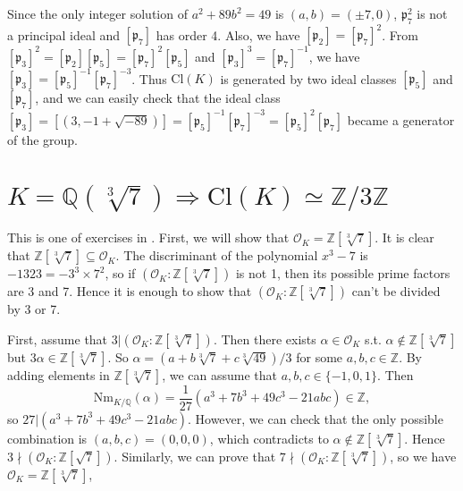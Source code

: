 \documentclass{article}
\newcommand{\Nm}{\mathrm{Nm}}
\newcommand{\Cl}{\mathrm{Cl}}
\begin{document}
Since the only integer solution of $a^{2} + 89b^{2} = 49$ is $(a, b) = (\pm 7, 0)$, $\mathfrak{p}_{7}^{2}$ is not a principal ideal and $[\mathfrak{p}_{7}]$ has order 4. Also, we have $[\mathfrak{p}_{2}] = [\mathfrak{p}_{7}]^{2}$. From $[\mathfrak{p}_{3}]^{2} = [\mathfrak{p}_{2}][\mathfrak{p}_{5}] = [\mathfrak{p}_{7}]^{2}[\mathfrak{p}_{5}]$ and $[\mathfrak{p}_{3}]^{3} = [\mathfrak{p}_{7}]^{-1}$, we have $[\mathfrak{p}_{3}] = [\mathfrak{p}_{5}]^{-1}[\mathfrak{p}_{7}]^{-3}$. 
Thus $\Cl(K)$ is generated by two ideal classes $[\mathfrak{p}_{5}]$ and $[\mathfrak{p}_{7}]$, and we can easily check that the ideal class $[\mathfrak{p}_{3}] =[(3, -1+\sqrt{-89})]= [\mathfrak{p}_{5}]^{-1}[\mathfrak{p}_{7}]^{-3} = [\mathfrak{p}_{5}]^{2}[\mathfrak{p}_{7}]$ became a generator of the group. 







\section{$K =\mathbb{Q}(\sqrt[3]{7})\Rightarrow \Cl(K)\simeq \mathbb{Z}/3\mathbb{Z}$}
This is one of  exercises in \cite{mar}.
First, we will show that $\mathcal{O}_{K} = \mathbb{Z}[\sqrt[3]{7}]$. 
It is clear that $\mathbb{Z}[\sqrt[3]{7}]\subseteq \mathcal{O}_{K}$. The discriminant of the polynomial $x^{3} - 7$ is $-1323  = -3^{3}\times 7^{2}$, so if $(\mathcal{O}_{K}:\mathbb{Z}[\sqrt[3]{7}])$ is not 1, then its possible prime factors are 3 and 7. Hence it is enough to show that $(\mathcal{O}_{K}:\mathbb{Z}[\sqrt[3]{7}])$ can't be divided by 3 or 7. 

First, assume that $3|(\mathcal{O}_{K}:\mathbb{Z}[\sqrt[3]{7}])$. 
Then there exists $\alpha\in \mathcal{O}_{K}$ s.t. $\alpha\not\in \mathbb{Z}[\sqrt[3]{7}]$ but $3\alpha\in \mathbb{Z}[\sqrt[3]{7}]$. 
So $\alpha = (a+b\sqrt[3]{7} + c\sqrt[3]{49})/3$ for some $a, b, c\in \mathbb{Z}$. By adding elements in $\mathbb{Z}[\sqrt[3]{7}]$, we can assume that $a, b, c\in \{-1, 0, 1\}$. Then 
$$
\Nm_{K/\mathbb{Q}}(\alpha) = \frac{1}{27}(a^{3} + 7b^{3} + 49c^{3} - 21 abc) \in \mathbb{Z},
$$
so $27|(a^{3} + 7b^{3} + 49c^{3} - 21 abc)$. However, we can check that the only possible combination is $(a, b, c) = (0, 0, 0)$, which contradicts to $\alpha\not\in \mathbb{Z}[\sqrt[3]{7}]$. Hence $3\nmid (\mathcal{O}_{K}:\mathbb{Z}[\sqrt{7}])$. Similarly, we can prove that $7\nmid(\mathcal{O}_{K}:\mathbb{Z}[\sqrt[3]{7}])$, so we have $\mathcal{O}_{K} = \mathbb{Z}[\sqrt[3]{7}]$, 
\end{document}
